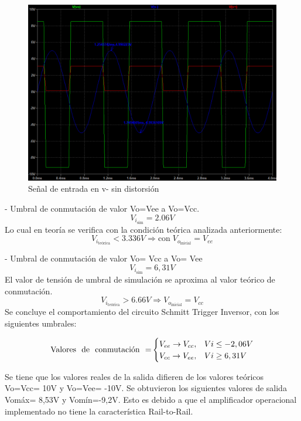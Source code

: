 \begin{figure}[H]
    \centering
    \includegraphics[width=1.0\linewidth]{Secciones/Circuito4/Circuito 4 - Vi no atenuada.png}
    \caption{Señal de entrada en v- sin distorsión}
    \label{fig:ViNoAtenuada}
\end{figure}
- Umbral de conmutación de valor Vo=Vee a Vo=Vcc. 
\[V_{i_{\text{sim}}}= 2.06V\]
Lo cual en teoría se verifica con la condición teórica analizada anteriormente:
\[V_{i_{\text{teórica}}} < 3.336V \Rightarrow \text{con} \; V_{o_{\text{inicial}}} = V_{ee}\]

- Umbral de conmutación de valor Vo= Vcc a Vo= Vee 
\[V_{i_{\text{sim}}}= 6,31V\]
El valor de tensión de umbral de simulación se aproxima al valor teórico de conmutación.
\[V_{i_{\text{teórica}}} > 6.66V \Rightarrow V_{o_{\text{inicial}}}= V_{cc} \]
Se concluye el comportamiento del circuito Schmitt Trigger Inversor, con los siguientes umbrales:

\begin{equation}
    \text{Valores \space de \space conmutación \space =}
    \begin{cases}
      V_{ee} \rightarrow V_{cc}, &  Vi\leq-2,06V \\
      V_{cc} \rightarrow V_{ee}, &  Vi\geq6,31V
    \end{cases}
  \end{equation}

Se tiene que los valores reales de la salida difieren de los valores teóricos Vo=Vcc= 10V y Vo=Vee= -10V. Se obtuvieron los siguientes valores de salida Vomáx= 8,53V y Vomín=-9,2V.  Esto es debido a que el amplificador operacional implementado no tiene la característica Rail-to-Rail. 


